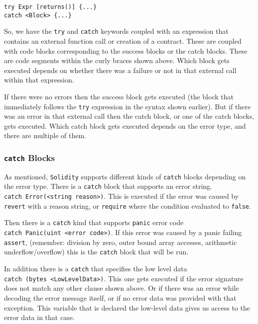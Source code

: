 \begin{lstlisting}[language=Solidity,numbers=none]
try Expr [returns()] {...}
catch <Block> {...}
\end{lstlisting}

So, we have the \texttt{try} and \texttt{catch} keywords coupled with an
expression that contains an external function call or creation of a
contract. These are coupled with code blocks corresponding to the
success blocks or the catch blocks. These are code segments within the
curly braces shown above. Which block gets executed depends on whether
there was a failure or not in that external call within that expression.

If there were no errors then the success block gets executed (the block
that immediately follows the \texttt{try} expression in the syntax shown
earlier). But if there was an error in that external call then the catch
block, or one of the catch blocks, gets executed. Which catch block gets
executed depends on the error type, and there are multiple of them.

\subsubsection{\texorpdfstring{\texttt{catch}
Blocks}{catch Blocks}}\label{catch-blocks}

As mentioned, \texttt{Solidity} supports different kinds of
\texttt{catch} blocks depending on the error type. There is a
\texttt{catch} block that supports an error string.
\texttt{catch\ Error(\textless{}string\ reason\textgreater{})}. This is
executed if the error was caused by \texttt{revert} with a reason
string, or \texttt{require} where the condition evaluated to
\texttt{false}.

Then there is a \texttt{catch} kind that supports \texttt{panic} error
code \texttt{catch\ Panic(uint\ \textless{}error\ code\textgreater{})}.
If this error was caused by a panic failing \texttt{assert}, (remember:
division by zero, outer bound array accesses, arithmetic
underflow/overflow) this is the \texttt{catch} block that will be run.

In addition there is a \texttt{catch} that specifies the low level data
\texttt{catch\ (bytes\ \textless{}LowLevelData\textgreater{})}. This one
gets executed if the error signature does not match any other clause
shown above. Or if there was an error while decoding the error message
itself, or if no error data was provided with that exception. This
variable that is declared the low-level data gives us access to the
error data in that case.

